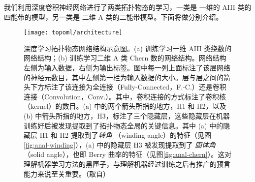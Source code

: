 我们利用深度卷积神经网络进行了两类拓扑物态的学习，一类是 一维的 AIII 类的四能带的模型，另一类是 二维 A 类的二能带模型。下面将做分别介绍。

\begin{figure}[t]
\centering
\texttt{[image: topoml/architecture]}
\caption{深度学习拓扑物态网络结构示意图。(a) 训练学习一维 AIII 类绕数的网络结构；(b) 训练学习二维 A 类 Chern 数的网络结构。网络结构左侧为输入数据，右侧为输出标签。图中每一列上面标注了该层网络的神经元数目，其中左侧第一栏为输入数据的大小。层与层之间的箭头下方标注了该连接为全连接（Fully-Connected，F.-C.）还是卷积连接（Convolution，Conv.）。其中，卷积连接的方式标注了卷积核（kernel）的数目。(a) 中的两个箭头所指的地方，H1 和 H2，以及 (b) 中箭头所指的地方，H3，标注了三个隐藏层，这些隐藏层在机器训练好后被发现提取到了拓扑物态全局的关键信息。其中 (a) 中的隐藏层 H1 和 H2 提取到了\textit{转角} （winding angle）的特征（见图\ref{fig:anal-winding}），(a) 中的隐藏层 H3 被发现提取到了 \textit{固体角}（solid angle），也即 Berry 曲率的特征（见图\ref{fig:anal-chern}）。这对理解机器学习方法的黑匣子，与理解机器经过训练之后有推广的预言能力来说至关重要。（取自）}
\label{fig:architecture}
\end{figure}




